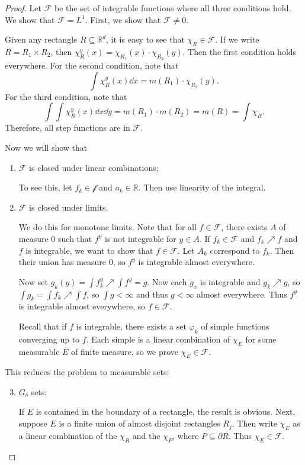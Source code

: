 \documentclass[leqno, openany]{memoir}
\theoremstyle{definition}
\theoremstyle{remark}
\theoremstyle{plain}
\theoremstyle{definition}
\theoremstyle{remark}
\newcommand{\R}{\mathbb{R}}
\newcommand{\mc}[1]{\mathcal{#1}}
\begin{document}
\begin{proof}
    Let $\mc{F}$ be the set of integrable functions where all three conditions hold. We show that $\mc{F} = L^1$. First, we show that $\mc{F} \neq 0$.

    Given any rectangle $R \subseteq \R^d$, it is easy to see that $\chi_R \in \mc{F}$. If we write $R = R_1 \times R_2$, then $\chi_R^y(x) = \chi_{R_1}(x) \cdot \chi_{R_2}(y)$. Then the first condition holds everywhere. For the second condition, note that
    \[ \int \chi_R^y(x) \dd{x} = m(R_1) \cdot \chi_{R_2}(y). \]
    For the third condition, note that 
    \[ \int \int \chi_R^y(x) \dd{x} \dd{y} = m(R_1) \cdot m(R_2) = m(R) = \int \chi_R. \]
    Therefore, all step functions are in $\mc{F}$.

    Now we will show that
    \begin{enumerate}
        \item $\mc{F}$ is closed under linear combinations;

            To see this, let $f_k \in \mc{f}$ and $a_k \in \R$. Then use linearity of the integral.
        \item $\mc{F}$ is closed under limits.

            We do this for monotone limits. Note that for all $f \in \mc{F}$, there exists $A$ of measure $0$ such that $f^y$ is not integrable for $y \in A$. If $f_k \in \mc{F}$ and $f_k \nearrow f$ and $f$ is integrable, we want to show that $f \in \mc{F}$. Let $A_k$ correspond to $f_k$. Then their union has measure $0$, so $f^y$ is integrable almost everywhere. 

            Now set $g_k(y) = \int f_k^y \nearrow \int f^y = g$. Now each $g_x$ is integrable and $g_k \nearrow g$, so $\int g_k = \int f_k \nearrow \int f$, so $\int g < \infty$ and thus $g < \infty$ almost everywhere. Thus $f^y$ is integrable almost everywhere, so $f \in \mc{F}$.

            Recall that if $f$ is integrable, there exists a set $\varphi_k$ of simple functions converging up to $f$. Each simple is a linear combination of $\chi_E$ for some measurable $E$ of finite measure, so we prove $\chi_E \in \mc{F}$.
    \end{enumerate}
    This reduces the problem to measurable sets:
    \begin{enumerate}
        \setcounter{enumi}{2}
        \item $G_{\delta}$ sets;

            If $E$ is contained in the boundary of a rectangle, the result is obvious. Next, suppose $E$ is a finite union of almost disjoint rectangles $R_j$. Then write $\chi_E$ as a linear combination of the $\chi_R$ and the $\chi_P$, where $P \subseteq \partial R$. Thus $\chi_E \in \mc{F}$.


\end{enumerate}
\end{proof}
\end{document}
